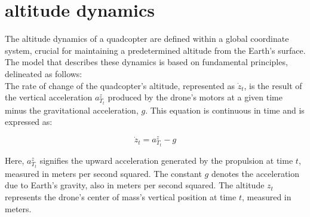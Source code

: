 \documentclass{article}
\begin{document}






\newpage
\section{altitude dynamics}
The altitude dynamics of a quadcopter are defined within a global coordinate system, crucial for maintaining a predetermined altitude from the Earth's surface. The model that describes these dynamics is based on fundamental principles, delineated as follows:
\\

\noindent
The rate of change of the quadcopter's altitude, represented as \( \dot{z}_t \), is the result of the vertical acceleration \( a^z_{T_t} \) produced by the drone's motors at a given time minus the gravitational acceleration, \( g \). This equation is continuous in time and is expressed as:

\begin{equation}
\dot{z}_t = a^z_{T_t} - g
\end{equation}

\noindent
Here, \( a^z_{T_t} \) signifies the upward acceleration generated by the propulsion at time \( t \), measured in meters per second squared. The constant \( g \) denotes the acceleration due to Earth's gravity, also in meters per second squared. The altitude \( z_t \) represents the drone's center of mass's vertical position at time \( t \), measured in meters.
\\
\end{document}
